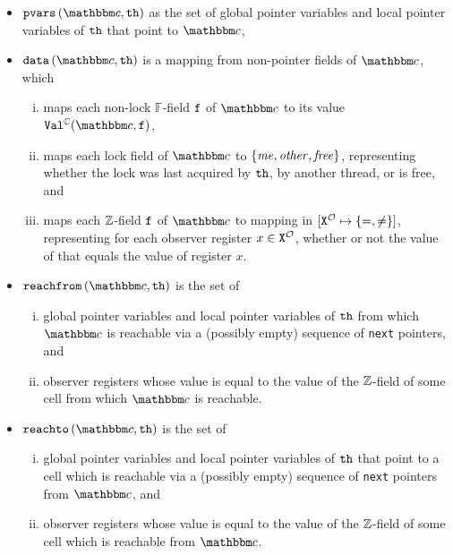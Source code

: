 \begin{itemize}
\item
  $\pvarsofth{\cell}{\thread}$ as the set of global pointer variables and
  local pointer variables of ${\tt th}$ that point to $\cell$,
\item
  $\valsofth{\cell}{\thread}$ is a mapping from non-pointer fields of $\cell$, which
  \begin{enumerate}[(i)]
    \item
    maps each non-lock $\mathbb{F}$-field $\mathtt{f}$ of $\cell$ to its value
    $\cellval(\cell,\field)$,
  \item
    maps each  lock field of $\cell$
    to $\left\{\mathit{me},\mathit{other},\mathit{free}\right\}$,
  representing whether the lock was last acquired by ${\tt th}$, by
  another thread, or is free,
  and
\item
  maps each ${\mathbb Z}$-field $\mathtt{f}$ of $\cell$ to mapping in
  $[{\tt X}^{{\mathcal O}} \mapsto{\left\{=,\neq\right\}}]$, representing for
  each observer register $x  \in {\tt X}^{{\mathcal O}}$, whether or not the value
  of that equals the value of register $x$.
  \end{enumerate}
\item
  $\reachfromofth{\cell}{\thread}$ is the set of
  \begin{enumerate}[(i)]
  \item global pointer variables and local pointer variables of ${\tt th}$
    from which $\cell$ is reachable via a (possibly empty)
  sequence of {\tt next} pointers, and
\item observer registers whose value is equal to the value of the ${\mathbb Z}$-field of some cell from which $\cell$ is reachable.
  \end{enumerate}
\item
  $\reachtoofth{\cell}{\thread}$ is the set of
  \begin{enumerate}[(i)]
  \item global pointer variables and local pointer variables of ${\tt th}$
    that point to a cell which is reachable via a (possibly empty)
  sequence of {\tt next} pointers from $\cell$, and
  \item observer registers whose value is equal to the value of the ${\mathbb Z}$-field of some cell which is reachable from $\cell$.
  \end{enumerate}
\end{itemize}
